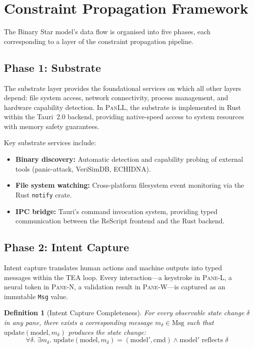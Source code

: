 \documentclass[11pt,a4paper]{article}
\newtheorem{definition}{Definition}[section]
\newcommand{\paneL}{\textsc{Pane-L}}
\newcommand{\paneN}{\textsc{Pane-N}}
\newcommand{\paneW}{\textsc{Pane-W}}
\newcommand{\panll}{\textsc{PanLL}}
\newcommand{\tea}{\textsc{TEA}}
\begin{document}
\section{Constraint Propagation Framework}\label{sec:constraint-propagation}

The Binary Star model's data flow is organised into five phases,
each corresponding to a layer of the constraint propagation
pipeline.

\subsection{Phase 1: Substrate}

The substrate layer provides the foundational services on which all
other layers depend: file system access, network connectivity,
process management, and hardware capability detection. In \panll{},
the substrate is implemented in Rust within the Tauri~2.0 backend,
providing native-speed access to system resources with memory safety
guarantees.

Key substrate services include:
\begin{itemize}
  \item \textbf{Binary discovery:} Automatic detection and capability
    probing of external tools (panic-attack, VeriSimDB, ECHIDNA).
  \item \textbf{File system watching:} Cross-platform filesystem
    event monitoring via the Rust \texttt{notify} crate.
  \item \textbf{IPC bridge:} Tauri's command invocation system,
    providing typed communication between the ReScript frontend
    and the Rust backend.
\end{itemize}

\subsection{Phase 2: Intent Capture}

Intent capture translates human actions and machine outputs into
typed messages within the \tea{} loop. Every interaction---a
keystroke in \paneL{}, a neural token in \paneN{}, a validation
result in \paneW{}---is captured as an immutable \texttt{Msg} value.

\begin{definition}[Intent Capture Completeness]\label{def:capture}
For every observable state change $\delta$ in any pane, there exists
a corresponding message $m_\delta \in \text{Msg}$ such that
$\text{update}(\text{model}, m_\delta)$ produces the state change:
\[
  \forall \delta.\; \exists m_\delta.\;
    \text{update}(\text{model}, m_\delta) = (\text{model}', \text{cmd})
    \land \text{model}' \text{ reflects } \delta
\]
\end{definition}
\end{document}
